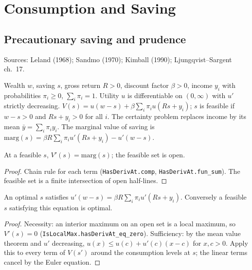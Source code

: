 \chapter{Consumption and Saving}
\label{chap:consumption}

\section{Precautionary saving and prudence}
\label{sec:precautionary}

Sources: Leland (1968); Sandmo (1970); Kimball (1990); Ljungqvist--Sargent ch.~17.

\begin{definition}
\label{def:prec_problem}
\leanok
Wealth $w$, saving $s$, gross return $R > 0$, discount factor $\beta > 0$, income $y_i$ with probabilities
$\pi_i \ge 0$, $\sum_i\pi_i = 1$. Utility $u$ is differentiable on $(0,\infty)$ with $u'$ strictly decreasing.
$V(s) = u(w - s) + \beta\sum_i\pi_iu(Rs + y_i)$; $s$ is feasible if $w - s > 0$ and $Rs + y_i > 0$ for all $i$.
The certainty problem replaces income by its mean $\bar y = \sum_i\pi_iy_i$. The marginal value of saving is
$\mathrm{marg}(s) = \beta R\sum_i\pi_iu'(Rs + y_i) - u'(w - s)$.
\end{definition}

\begin{lemma}
\label{lem:prec_deriv}
\leanok
{}
At a feasible $s$, $V'(s) = \mathrm{marg}(s)$; the feasible set is open.
\end{lemma}
\begin{proof}
\leanok
Chain rule for each term (\texttt{HasDerivAt.comp}, \texttt{HasDerivAt.fun\_sum}). The feasible set is a finite
intersection of open half-lines.
\end{proof}

\begin{theorem}
\label{thm:prec_foc}
\leanok
{}
An optimal $s$ satisfies $u'(w - s) = \beta R\sum_i\pi_iu'(Rs + y_i)$. Conversely a feasible $s$ satisfying this
equation is optimal.
\end{theorem}
\begin{proof}
\leanok
Necessity: an interior maximum on an open set is a local maximum, so $V'(s) = 0$ (\texttt{IsLocalMax.hasDerivAt\_eq\_zero}).
Sufficiency: by the mean value theorem and $u'$ decreasing, $u(x) \le u(c) + u'(c)(x - c)$ for $x, c > 0$. Apply this
to every term of $V(s')$ around the consumption levels at $s$; the linear terms cancel by the Euler equation.
\end{proof}

